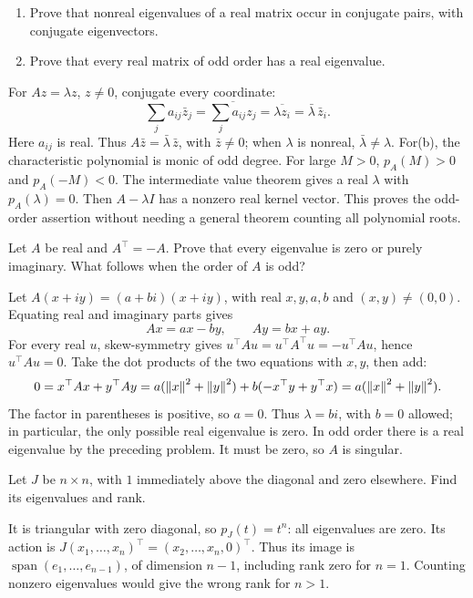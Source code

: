 \begin{problem}\label{ex:08:odd-real}
\begin{enumerate}
\item Prove that nonreal eigenvalues of a real matrix occur in conjugate
pairs, with conjugate eigenvectors.
\item Prove that every real matrix of odd order has a real eigenvalue.
\end{enumerate}
\end{problem}
\begin{solution}
For \(Az=\lambda z\), \(z\ne0\), conjugate every coordinate:
\[
 \sum_j a_{ij}\bar z_j
 =\overline{\sum_j a_{ij}z_j}
 =\overline{\lambda z_i}
 =\bar\lambda\,\bar z_i.
\]
Here \(a_{ij}\) is real. Thus \(A\bar z=\bar\lambda\,\bar z\), with
\(\bar z\ne0\); when \(\lambda\) is nonreal, \(\bar\lambda\ne\lambda\).
For(b), the characteristic polynomial is monic of odd degree.
For large \(M>0\), \(p_A(M)>0\) and \(p_A(-M)<0\).
The intermediate value theorem gives a real \(\lambda\) with
\(p_A(\lambda)=0\). Then \(A-\lambda I\) has a nonzero real kernel vector.
This proves the odd-order assertion without needing a general theorem
counting all polynomial roots.
\end{solution}

\begin{problem}\label{ex:08:skew}
Let \(A\) be real and \(A^\top=-A\). Prove that every eigenvalue is
zero or purely imaginary. What follows when the order of \(A\) is odd?
\end{problem}
\begin{solution}
Let \(A(x+iy)=(a+bi)(x+iy)\), with real \(x,y,a,b\) and
\((x,y)\ne(0,0)\). Equating real and imaginary parts gives
\[
 Ax=ax-by,\qquad Ay=bx+ay.
\]
For every real \(u\), skew-symmetry gives
\(u^\top Au=u^\top A^\top u=-u^\top Au\), hence \(u^\top Au=0\).
Take the dot products of the two equations with \(x,y\), then add:
\[
 0=x^\top Ax+y^\top Ay
  =a(\left\lVert x\right\rVert^2+\left\lVert y\right\rVert^2)+b(-x^\top y+y^\top x)
  =a(\left\lVert x\right\rVert^2+\left\lVert y\right\rVert^2).
\]
The factor in parentheses is positive, so \(a=0\).
Thus \(\lambda=bi\), with \(b=0\) allowed; in particular, the only
possible real eigenvalue is zero.
In odd order there is a real eigenvalue by the preceding problem.
It must be zero, so \(A\) is singular.
\end{solution}

\begin{problem}\label{ex:08:shift}
Let \(J\) be \(n\times n\), with \(1\) immediately above the diagonal
and zero elsewhere. Find its eigenvalues and rank.
\end{problem}
\begin{solution}
It is triangular with zero diagonal, so \(p_J(t)=t^n\): all eigenvalues
are zero. Its action is
\(J(x_1,\ldots,x_n)^\top=(x_2,\ldots,x_n,0)^\top\).
Thus its image is \(\operatorname{span}(e_1,\ldots,e_{n-1})\),
of dimension \(n-1\), including rank zero for \(n=1\).
Counting nonzero eigenvalues would give the wrong rank for \(n>1\).
\end{solution}

